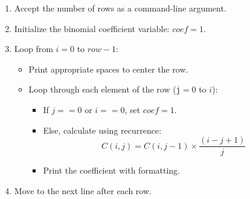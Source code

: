 \begin{enumerate}
    \item Accept the number of rows as a command-line argument.
    \item Initialize the binomial coefficient variable: \texttt{$coef = 1$}.
    \item Loop from \texttt{$i = 0$} to \texttt{$row - 1$}:
    \begin{itemize}
        \item Print appropriate spaces to center the row.
        \item Loop through each element of the row (\texttt{j$ = 0$} to \texttt{$i$}):
        \begin{itemize}
            \item If \texttt{$j == 0$} or \texttt{$i == 0$}, set \texttt{$coef = 1$}.
            \item Else, calculate using recurrence:
            \[
            C(i, j) = C(i, j-1) \times \frac{(i - j + 1)}{j}
            \]
            \item Print the coefficient with formatting.
        \end{itemize}
    \end{itemize}
    \item Move to the next line after each row.
\end{enumerate}